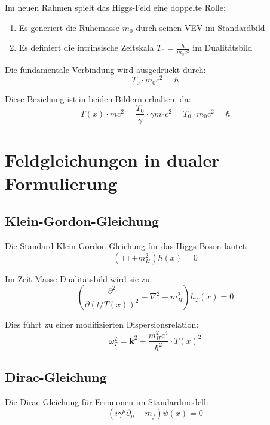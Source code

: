 \documentclass[a4paper,12pt]{article}
\newcommand{\Tfield}{T(x)} %
\begin{document}
	Im neuen Rahmen spielt das Higgs-Feld eine doppelte Rolle:
	\begin{enumerate}
		\item Es generiert die Ruhemasse $m_0$ durch seinen VEV im Standardbild
		\item Es definiert die intrinsische Zeitskala $T_0 = \frac{\hbar}{m_0 c^2}$ im Dualitätsbild
	\end{enumerate}
	
	Die fundamentale Verbindung wird ausgedrückt durch:
	\begin{equation}
		T_0 \cdot m_0 c^2 = \hbar
	\end{equation}
	
	Diese Beziehung ist in beiden Bildern erhalten, da:
	\begin{equation}
		\Tfield \cdot m c^2 = \frac{T_0}{\gamma} \cdot \gamma m_0 c^2 = T_0 \cdot m_0 c^2 = \hbar
	\end{equation}
	\section{Feldgleichungen in dualer Formulierung}
	
	\subsection{Klein-Gordon-Gleichung}
	
	Die Standard-Klein-Gordon-Gleichung für das Higgs-Boson lautet:
	\begin{equation}
		(\Box + m_H^2) h(x) = 0
	\end{equation}
	
	Im Zeit-Masse-Dualitätsbild wird sie zu:
	\begin{equation}
		\left(\frac{\partial^2}{\partial(t/\Tfield)^2} - \nabla^2 + m_H^2\right) h_T(x) = 0
	\end{equation}
	
	Dies führt zu einer modifizierten Dispersionsrelation:
	\begin{equation}
		\omega_T^2 = \mathbf{k}^2 + \frac{m_H^2 c^4}{\hbar^2} \cdot \Tfield^2
	\end{equation}
	
	\subsection{Dirac-Gleichung}
	
	Die Dirac-Gleichung für Fermionen im Standardmodell:
	\begin{equation}
		(i\gamma^\mu\partial_\mu - m_f) \psi(x) = 0
	\end{equation}
	
\end{document}
